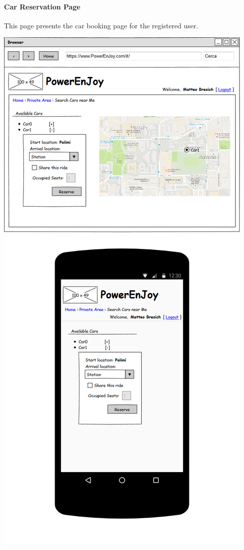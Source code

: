 \paragraph{Car Reservation Page} This page presents the car booking page for the registered user.
\begin{center}
	\includegraphics[width=0.6\linewidth]{"img/ui/search-car"}
\end{center}
\pagebreak

